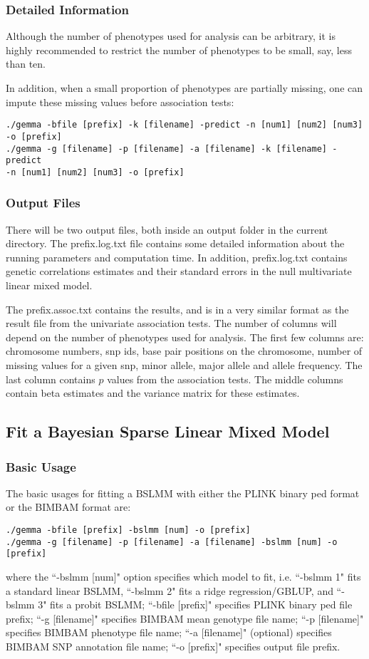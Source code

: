 \documentclass[11pt]{article}
\begin{document}
\subsubsection{Detailed Information}
Although the number of phenotypes used for analysis can be arbitrary, it is highly recommended to restrict the number of phenotypes to be small, say, less than ten. 

In addition, when a small proportion of phenotypes are partially missing, one can impute these missing values before association tests:
\begin{verbatim}
./gemma -bfile [prefix] -k [filename] -predict -n [num1] [num2] [num3] -o [prefix]
./gemma -g [filename] -p [filename] -a [filename] -k [filename] -predict 
-n [num1] [num2] [num3] -o [prefix]
\end{verbatim}

\subsubsection{Output Files}
There will be two output files, both inside an output folder in the current directory. The prefix.log.txt file contains some detailed information about the running parameters and computation time. In addition, prefix.log.txt contains genetic correlations estimates and their standard errors in the null multivariate linear mixed model.

The prefix.assoc.txt contains the results, and is in a very similar format as the result file from the univariate association tests. The number of columns will depend on the number of phenotypes used for analysis. The first few columns are: chromosome numbers, snp ids, base pair positions on the chromosome, number of missing values for a given snp, minor allele, major allele and allele frequency. The last column contains $p$ values from the association tests. The middle columns contain beta estimates and the variance matrix for these estimates. 



\subsection{Fit a Bayesian Sparse Linear Mixed Model}
\subsubsection{Basic Usage}
The basic usages for fitting a BSLMM with either the PLINK binary ped format or the BIMBAM format are:
\begin{verbatim}
./gemma -bfile [prefix] -bslmm [num] -o [prefix]
./gemma -g [filename] -p [filename] -a [filename] -bslmm [num] -o [prefix]
\end{verbatim}
where the ``-bslmm [num]" option specifies which model to fit, i.e. ``-bslmm 1" fits a standard linear BSLMM, ``-bslmm 2" fits a ridge regression/GBLUP, and ``-bslmm 3" fits a probit BSLMM; ``-bfile [prefix]" specifies PLINK binary ped file prefix; ``-g [filename]" specifies BIMBAM mean genotype file name; ``-p [filename]" specifies BIMBAM phenotype file name; ``-a [filename]" (optional) specifies BIMBAM SNP annotation file name; ``-o [prefix]" specifies output file prefix. 
\end{document}
